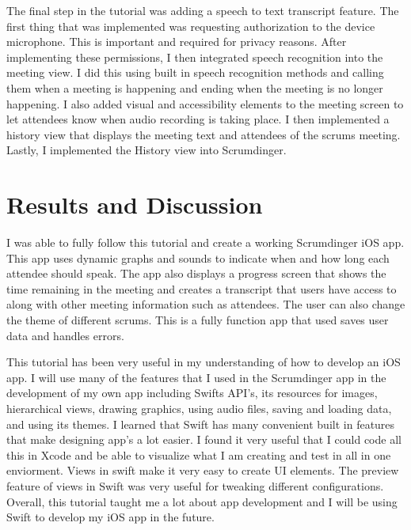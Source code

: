 \documentclass[10pt,twocolumn]{article}
\begin{document}
The final step in the tutorial was adding a speech to text transcript feature. The first thing that was implemented was requesting authorization to the device microphone. This is important and required for privacy reasons. After implementing these permissions, I then integrated speech recognition into the meeting view. I did this using built in speech recognition methods and calling them when a meeting is happening and ending when the meeting is no longer happening. I also added visual and accessibility elements to the meeting screen to let attendees know when audio recording is taking place. I then implemented a history view that displays the meeting text and attendees of the scrums meeting. Lastly, I implemented the History view into Scrumdinger.

\section{Results and Discussion}

I was able to fully follow this tutorial and create a working Scrumdinger iOS app. This app uses dynamic graphs and sounds to indicate when and how long each attendee should speak. The app also displays a progress screen that shows the time remaining in the meeting and creates a transcript that users have access to along with other meeting information such as attendees. The user can also change the theme of different scrums. This is a fully function app that used saves user data and handles errors. 

This tutorial has been very useful in my understanding of how to develop an iOS app. I will use many of the features that I used in the Scrumdinger app in the development of my own app including Swifts API's, its resources for images, hierarchical views, drawing graphics, using audio files, saving and loading data, and using its themes. I learned that Swift has many convenient built in features that make designing app's a lot easier. I found it very useful that I could code all this in Xcode and be able to visualize what I am creating and test in all in one enviorment. Views in swift make it very easy to create UI elements. The preview feature of views in Swift was very useful for tweaking different configurations. Overall, this tutorial taught me a lot about app development and I will be using Swift to develop my iOS app in the future.
\end{document}
